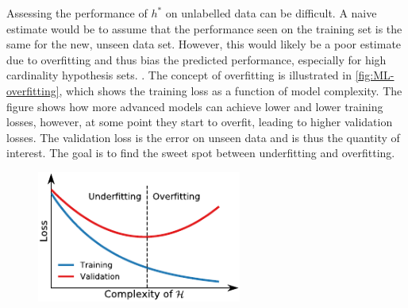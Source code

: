 Assessing the performance of $h^*$ on unlabelled data can be difficult. A naive estimate would be to assume that the performance seen on the training set is the same for the new, unseen data set. However, this would likely be a poor estimate due to overfitting and thus bias the predicted performance, especially for high cardinality hypothesis sets. \autocite{abu-mostafaLearningData2012a}. The concept of overfitting is illustrated in \autoref{fig:ML-overfitting}, which shows the training loss as a function of model complexity. The figure shows how more advanced models can achieve lower and lower training losses, however, at some point they start to overfit, leading to higher validation losses. The validation loss is the error on unseen data and is thus the quantity of interest. The goal is to find the sweet spot between underfitting and overfitting.

\begin{figure}[htbp]
    \centering
    \includegraphics[width=0.6\textwidth]{figures/MasterThesis-overfitting.pdf}
\end{figure}

